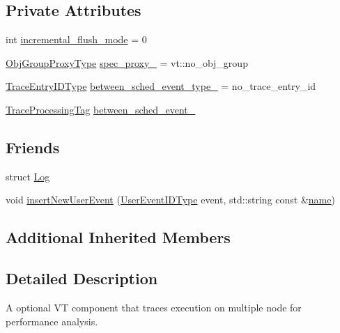 \subsection*{Private Attributes}
\begin{DoxyCompactItemize}
\item 
int \hyperlink{structvt_1_1trace_1_1_trace_a0f00be1050ef823347cf2d5daaa0e1c4}{incremental\+\_\+flush\+\_\+mode} = 0
\item 
\hyperlink{namespacevt_ad7cae989df485fccca57f0792a880a8e}{Obj\+Group\+Proxy\+Type} \hyperlink{structvt_1_1trace_1_1_trace_a15282e64860d2a553d39396c9c1fe784}{spec\+\_\+proxy\+\_\+} = vt\+::no\+\_\+obj\+\_\+group
\item 
\hyperlink{namespacevt_1_1trace_a3c14050715ba9eceaeff51fb3de64f2f}{Trace\+Entry\+I\+D\+Type} \hyperlink{structvt_1_1trace_1_1_trace_a3be76c8f807837a4b242a5a28c005599}{between\+\_\+sched\+\_\+event\+\_\+type\+\_\+} = no\+\_\+trace\+\_\+entry\+\_\+id
\item 
\hyperlink{structvt_1_1trace_1_1_trace_processing_tag}{Trace\+Processing\+Tag} \hyperlink{structvt_1_1trace_1_1_trace_a3fdadda342771b037bb85aa77e0fc9cb}{between\+\_\+sched\+\_\+event\+\_\+}
\end{DoxyCompactItemize}
\subsection*{Friends}
\begin{DoxyCompactItemize}
\item 
struct \hyperlink{structvt_1_1trace_1_1_trace_add132ae9df1b7ef820c8082c32b0f839}{Log}
\item 
void \hyperlink{structvt_1_1trace_1_1_trace_a17caa1eeb27fd6a4af8786a7f0679d77}{insert\+New\+User\+Event} (\hyperlink{namespacevt_1_1trace_a5908920d051c144c89f17c69ed262350}{User\+Event\+I\+D\+Type} event, std\+::string const \&\hyperlink{structvt_1_1trace_1_1_trace_aaae4bbf6d009229a5c8b9db67a127942}{name})
\end{DoxyCompactItemize}
\subsection*{Additional Inherited Members}


\subsection{Detailed Description}
A optional VT component that traces execution on multiple node for performance analysis. 

